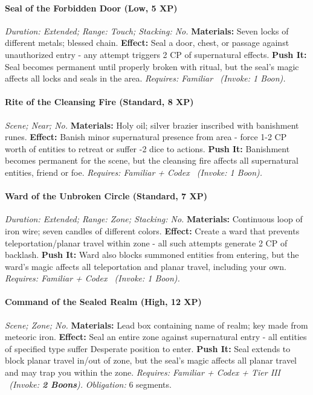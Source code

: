 \documentclass[12pt,twoside]{book}
\begin{document}
\paragraph{Seal of the Forbidden Door (Low, 5 XP)} \emph{Duration: Extended; Range: Touch; Stacking: No.}
\textbf{Materials:} Seven locks of different metals; blessed chain.
\textbf{Effect:} Seal a door, chest, or passage against unauthorized entry - any attempt triggers 2 CP of supernatural effects.
\textbf{Push It:} Seal becomes permanent until properly broken with ritual, but the seal's magic affects all locks and seals in the area.
\emph{Requires: Familiar \ (\textit{Invoke:} 1 Boon).}
\paragraph{Rite of the Cleansing Fire (Standard, 8 XP)} \emph{Scene; Near; No.}
\textbf{Materials:} Holy oil; silver brazier inscribed with banishment runes.
\textbf{Effect:} Banish minor supernatural presence from area - force 1-2 CP worth of entities to retreat or suffer -2 dice to actions.
\textbf{Push It:} Banishment becomes permanent for the scene, but the cleansing fire affects all supernatural entities, friend or foe.
\emph{Requires: Familiar + Codex \ (\textit{Invoke:} 1 Boon).}
\paragraph{Ward of the Unbroken Circle (Standard, 7 XP)} \emph{Duration: Extended; Range: Zone; Stacking: No.}
\textbf{Materials:} Continuous loop of iron wire; seven candles of different colors.
\textbf{Effect:} Create a ward that prevents teleportation/planar travel within zone - all such attempts generate 2 CP of backlash.
\textbf{Push It:} Ward also blocks summoned entities from entering, but the ward's magic affects all teleportation and planar travel, including your own.
\emph{Requires: Familiar + Codex \ (\textit{Invoke:} 1 Boon).}
\paragraph{Command of the Sealed Realm (High, 12 XP)} \emph{Scene; Zone; No.}
\textbf{Materials:} Lead box containing name of realm; key made from meteoric iron.
\textbf{Effect:} Seal an entire zone against supernatural entry - all entities of specified type suffer Desperate position to enter.
\textbf{Push It:} Seal extends to block planar travel in/out of zone, but the seal's magic affects all planar travel and may trap you within the zone.
\emph{Requires: Familiar + Codex + Tier III \ (\textit{Invoke:} \textbf{2 Boons}).}
\emph{Obligation:} 6 segments.
\end{document}
